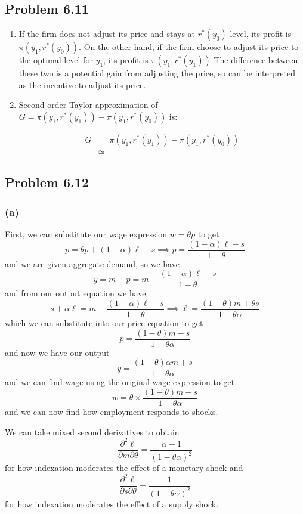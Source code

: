 \documentclass[11pt]{amsart}
\begin{document}
\subsection{Problem 6.11}
\begin{enumerate}[label = (\alph*)]
	\item If the firm does not adjust its price and stays at $r^{*}(y_0)$ level, its profit is $\pi \left( y_1, r^{*}(y_0)  \right)$. On the other hand, if the firm choose to adjust its price to the optimal level for $y_1$, its profit is $\pi \left( y_1, r^{*}(y_1)  \right)$ The difference between these two is a potential gain from adjusting the price, so can be interpreted as the incentive to adjust its price. 
	\item Second-order Taylor approximation of $G = \pi \left( y_1, r^{*}(y_1)  \right) - \pi \left( y_1, r^{*}(y_0)  \right)$ is: 
	
	\begin{align*}
	G &= \pi \left( y_1, r^{*}(y_1)  \right) - \pi \left( y_1, r^{*}(y_0)  \right) \\
	 & \simeq 
	\end{align*}
\end{enumerate}
    \subsection{Problem 6.12}
    
    \subsubsection*{(a)}
    First, we can substitute our wage expression $w = \theta p$ to get
    \[
    p = \theta p + (1-\alpha) \ell - s \implies p = \frac{(1-\alpha) \ell - s}{1-\theta}
    \]
    and we are given aggregate demand, so we have
    \[
    y = m - p = m - \frac{(1-\alpha) \ell - s}{1-\theta}
    \]
    and from our output equation we have
    \[
    s + \alpha \ell = m - \frac{(1-\alpha) \ell - s}{1-\theta} \implies \ell = \frac{(1-\theta) m + \theta s}{1-\theta \alpha}
    \]
    which we can substitute into our price equation to get
    \[
    p = \frac{(1-\theta) m - s}{1-\theta \alpha}
    \]
    and now we have our output
    \[
    y = \frac{(1-\theta) \alpha m + s}{1-\theta \alpha}
    \]
    and we can find wage using the original wage expression to get
    \[
    w = \theta \times \frac{(1-\theta) m - s}{1-\theta \alpha}
    \]
    and we can now find how employment responds to shocks.
    
    We can take mixed second derivatives to obtain
    \[
    \frac{\partial^2 \ell}{\partial m \partial \theta} = \frac{\alpha - 1}{(1-\theta \alpha)^2}
    \]
    for how indexation moderates the effect of a monetary shock and
    \[
    \frac{\partial^2 \ell}{\partial s \partial \theta} = \frac{1}{(1-\theta \alpha)^2}
    \]
    for how indexation moderates the effect of a supply shock.
    
\end{document}

